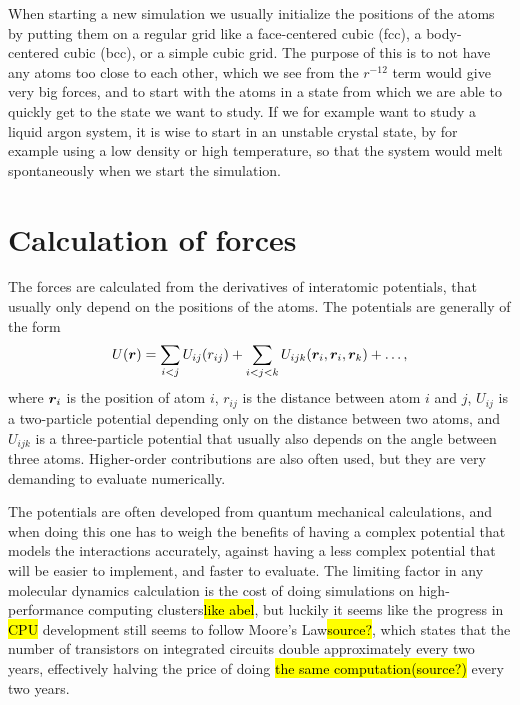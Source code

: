 When starting a new simulation we usually initialize the positions of the atoms by putting them on a regular grid like a face-centered cubic (fcc), a body-centered cubic (bcc), or a simple cubic grid. The purpose of this is to not have any atoms too close to each other, which we see from the $r^{-12}$ term would give very big forces, and to start with the atoms in a state from which we are able to quickly get to the state we want to study. If we for example want to study a liquid argon system, it is wise to start in an unstable crystal state, by for example using a low density or high temperature, so that the system would melt spontaneously when we start the simulation.

\section{Calculation of forces\label{sec:program:lj}}
The forces are calculated from the derivatives of interatomic potentials, that usually only depend on the positions of the atoms. The potentials are generally of the form
\begin{align*}
    U(\boldsymbol{r}) = \sum_{i<j} U_{ij}(r_{ij}) + \sum_{i<j<k} U_{ijk}(\boldsymbol{r}_i, \boldsymbol{r}_i, \boldsymbol{r}_k) + \dots,
\end{align*}
where $\boldsymbol{r}_i$ is the position of atom $i$, $r_{ij}$ is the distance between atom $i$ and $j$, $U_{ij}$ is a two-particle potential depending only on the distance between two atoms, and $U_{ijk}$ is a three-particle potential that usually also depends on the angle between three atoms. Higher-order contributions are also often used, but they are very demanding to evaluate numerically.

The potentials are often developed from quantum mechanical calculations, and when doing this one has to weigh the benefits of having a complex potential that models the interactions accurately, against having a less complex potential that will be easier to implement, and faster to evaluate. The limiting factor in any molecular dynamics calculation is the cost of doing simulations on high-performance computing clusters\hl{like abel}, but luckily it seems like the progress in \hl{CPU} development still seems to follow Moore's Law\hl{source?}, which states that the number of transistors on integrated circuits double approximately every two years\cite{moore1965cramming}, effectively halving the price of doing \hl{the same computation}\hl{(source?)} every two years.

